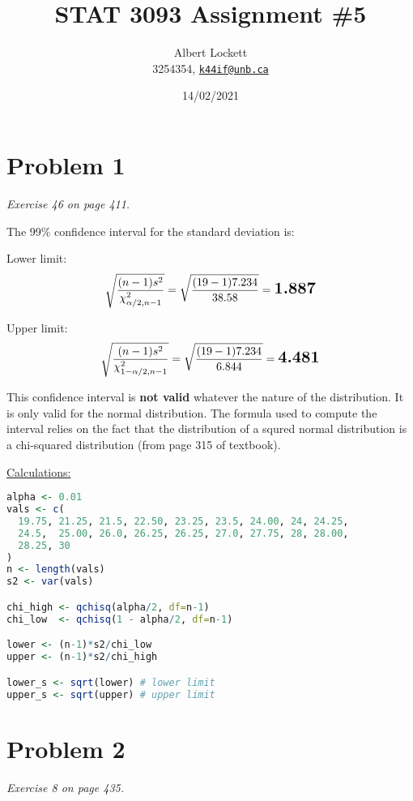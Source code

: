 \documentclass[a4paper,11pt]{article}
\begin{document}
\title{STAT 3093 Assignment \#5}
\author{
  Albert Lockett \\ 
  3254354, 
  \href{mailto:k44if@unb.ca}{\texttt{k44if@unb.ca}}
  }
\date{14/02/2021}

\section*{Problem 1}
\textit{Exercise 46 on page 411.}\newline

The 99\% confidence interval for the standard deviation is:\newline

Lower limit:
\[ 
  \sqrt{\frac{(n - 1)s^2}{\chi^2_{\alpha/2,n-1}}} =
  \sqrt{\frac{(19 -1) 7.234}{38.58}} =
  \textbf{\Large{1.887}}
\]

\vspace{5mm}
Upper limit:
\[
  \sqrt{\frac{(n - 1)s^2}{\chi^2_{1-\alpha/2,n-1}}} =
  \sqrt{\frac{(19 -1) 7.234}{6.844}} =
  \textbf{\Large{4.481}}
\]

\vspace{5mm}
This confidence interval is \textbf{not valid} whatever the nature of the distribution. 
It is only valid for the normal distribution. The formula used to compute the interval relies
on the fact that the distribution of a squred normal distribution is a chi-squared distribution
(from page 315 of textbook).

\vspace{1cm}
\underline{Calculations:}
\vspace{2mm}
\begin{lstlisting}[language=R]
alpha <- 0.01
vals <- c(
  19.75, 21.25, 21.5, 22.50, 23.25, 23.5, 24.00, 24, 24.25, 
  24.5,  25.00, 26.0, 26.25, 26.25, 27.0, 27.75, 28, 28.00, 
  28.25, 30
)
n <- length(vals)
s2 <- var(vals)

chi_high <- qchisq(alpha/2, df=n-1)
chi_low  <- qchisq(1 - alpha/2, df=n-1)

lower <- (n-1)*s2/chi_low
upper <- (n-1)*s2/chi_high

lower_s <- sqrt(lower) # lower limit
upper_s <- sqrt(upper) # upper limit
\end{lstlisting}

\clearpage

\section*{Problem 2}
\textit{Exercise 8 on page 435.}\newline
\end{document}
